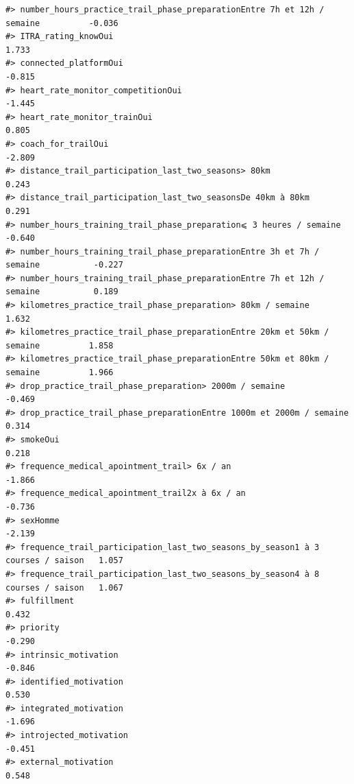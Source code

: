 \documentclass[
]{article}
\begin{document}
\begin{verbatim}
#> number_hours_practice_trail_phase_preparationEntre 7h et 12h / semaine          -0.036
#> ITRA_rating_knowOui                                                              1.733
#> connected_platformOui                                                           -0.815
#> heart_rate_monitor_competitionOui                                               -1.445
#> heart_rate_monitor_trainOui                                                      0.805
#> coach_for_trailOui                                                              -2.809
#> distance_trail_participation_last_two_seasons> 80km                              0.243
#> distance_trail_participation_last_two_seasonsDe 40km à 80km                      0.291
#> number_hours_training_trail_phase_preparation⩽ 3 heures / semaine               -0.640
#> number_hours_training_trail_phase_preparationEntre 3h et 7h / semaine           -0.227
#> number_hours_training_trail_phase_preparationEntre 7h et 12h / semaine           0.189
#> kilometres_practice_trail_phase_preparation> 80km / semaine                      1.632
#> kilometres_practice_trail_phase_preparationEntre 20km et 50km / semaine          1.858
#> kilometres_practice_trail_phase_preparationEntre 50km et 80km / semaine          1.966
#> drop_practice_trail_phase_preparation> 2000m / semaine                          -0.469
#> drop_practice_trail_phase_preparationEntre 1000m et 2000m / semaine              0.314
#> smokeOui                                                                         0.218
#> frequence_medical_apointment_trail> 6x / an                                     -1.866
#> frequence_medical_apointment_trail2x à 6x / an                                  -0.736
#> sexHomme                                                                        -2.139
#> frequence_trail_participation_last_two_seasons_by_season1 à 3 courses / saison   1.057
#> frequence_trail_participation_last_two_seasons_by_season4 à 8 courses / saison   1.067
#> fulfillment                                                                      0.432
#> priority                                                                        -0.290
#> intrinsic_motivation                                                            -0.846
#> identified_motivation                                                            0.530
#> integrated_motivation                                                           -1.696
#> introjected_motivation                                                          -0.451
#> external_motivation                                                              0.548

\end{verbatim}
\end{document}
